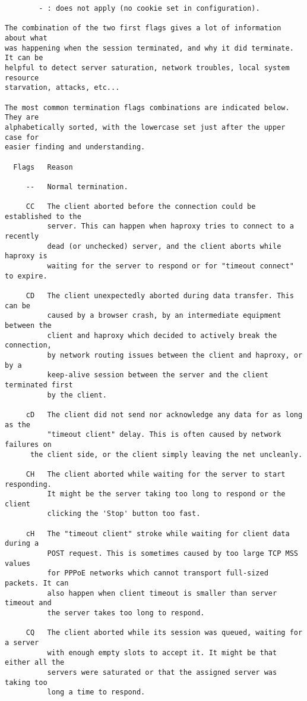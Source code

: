 \begin{verbatim}
        - : does not apply (no cookie set in configuration).

The combination of the two first flags gives a lot of information about what
was happening when the session terminated, and why it did terminate. It can be
helpful to detect server saturation, network troubles, local system resource
starvation, attacks, etc...

The most common termination flags combinations are indicated below. They are
alphabetically sorted, with the lowercase set just after the upper case for
easier finding and understanding.

  Flags   Reason

     --   Normal termination.

     CC   The client aborted before the connection could be established to the
          server. This can happen when haproxy tries to connect to a recently
          dead (or unchecked) server, and the client aborts while haproxy is
          waiting for the server to respond or for "timeout connect" to expire.

     CD   The client unexpectedly aborted during data transfer. This can be
          caused by a browser crash, by an intermediate equipment between the
          client and haproxy which decided to actively break the connection,
          by network routing issues between the client and haproxy, or by a
          keep-alive session between the server and the client terminated first
          by the client.

     cD   The client did not send nor acknowledge any data for as long as the
          "timeout client" delay. This is often caused by network failures on
	  the client side, or the client simply leaving the net uncleanly.

     CH   The client aborted while waiting for the server to start responding.
          It might be the server taking too long to respond or the client
          clicking the 'Stop' button too fast.

     cH   The "timeout client" stroke while waiting for client data during a
          POST request. This is sometimes caused by too large TCP MSS values
          for PPPoE networks which cannot transport full-sized packets. It can
          also happen when client timeout is smaller than server timeout and
          the server takes too long to respond.

     CQ   The client aborted while its session was queued, waiting for a server
          with enough empty slots to accept it. It might be that either all the
          servers were saturated or that the assigned server was taking too
          long a time to respond.


\end{verbatim}
